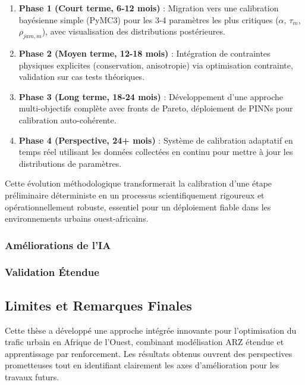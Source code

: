 \begin{enumerate}
    \item \textbf{Phase 1 (Court terme, 6-12 mois)} : Migration vers une calibration bayésienne simple (PyMC3) pour les 3-4 paramètres les plus critiques ($\alpha$, $\tau_m$, $\rho_{jam,m}$), avec visualisation des distributions postérieures.
    \item \textbf{Phase 2 (Moyen terme, 12-18 mois)} : Intégration de contraintes physiques explicites (conservation, anisotropie) via optimisation contrainte, validation sur cas tests théoriques.
    \item \textbf{Phase 3 (Long terme, 18-24 mois)} : Développement d'une approche multi-objectifs complète avec fronts de Pareto, déploiement de PINNs pour calibration auto-cohérente.
    \item \textbf{Phase 4 (Perspective, 24+ mois)} : Système de calibration adaptatif en temps réel utilisant les données collectées en continu pour mettre à jour les distributions de paramètres.
\end{enumerate}

Cette évolution méthodologique transformerait la calibration d'une étape préliminaire déterministe en un processus scientifiquement rigoureux et opérationnellement robuste, essentiel pour un déploiement fiable dans les environnements urbains ouest-africains.

\subsubsection{Améliorations de l'IA}

\subsubsection{Validation Étendue}

\subsection{Limites et Remarques Finales}
Cette thèse a développé une approche intégrée innovante pour l'optimisation du trafic urbain en Afrique de l'Ouest, combinant modélisation ARZ étendue et apprentissage par renforcement. Les résultats obtenus ouvrent des perspectives prometteuses tout en identifiant clairement les axes d'amélioration pour les travaux futurs.

